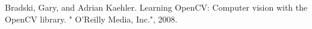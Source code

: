 
\begin{thebibliography}{x}

Bradski, Gary, and Adrian Kaehler. Learning OpenCV: Computer vision with the OpenCV library. " O'Reilly Media, Inc.", 2008.

\end{thebibliography}